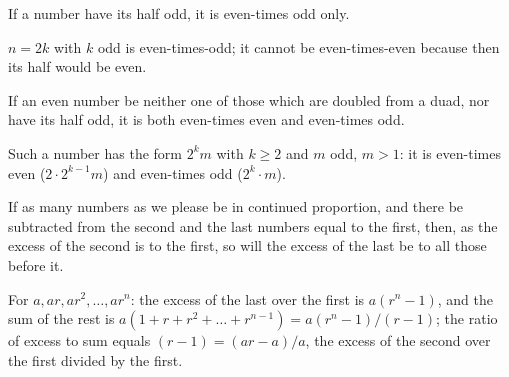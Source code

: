 \documentclass{rrxiv}
\begin{document}
\begin{claim}
\label{prop:IX.33}
If a number have its half odd, it is even-times odd only.
\end{claim}
\begin{evidence}[Proof of IX.33]
\label{ev:IX.33}
$n = 2k$ with $k$ odd is even-times-odd; it cannot be even-times-even
because then its half would be even.
\end{evidence}

\begin{claim}
\label{prop:IX.34}
If an even number be neither one of those which are doubled from a
duad, nor have its half odd, it is both even-times even and
even-times odd.
\end{claim}
\begin{evidence}[Proof of IX.34]
\label{ev:IX.34}
Such a number has the form $2^k m$ with $k \ge 2$ and $m$ odd, $m
> 1$: it is even-times even ($2 \cdot 2^{k-1} m$) and even-times odd
($2^k \cdot m$).
\end{evidence}

\begin{claim}
\label{prop:IX.35}
If as many numbers as we please be in continued proportion, and there
be subtracted from the second and the last numbers equal to the
first, then, as the excess of the second is to the first, so will the
excess of the last be to all those before it.
\end{claim}
\begin{evidence}[Proof of IX.35]
\label{ev:IX.35}
For $a, ar, ar^2, \dots, ar^n$: the excess of the last over the
first is $a(r^n - 1)$, and the sum of the rest is $a(1 + r + r^2 +
\dots + r^{n-1}) = a (r^n - 1) / (r - 1)$; the ratio of excess to
sum equals $(r - 1) = (ar - a) / a$, the excess of the second over
the first divided by the first.
\end{evidence}
\end{document}
